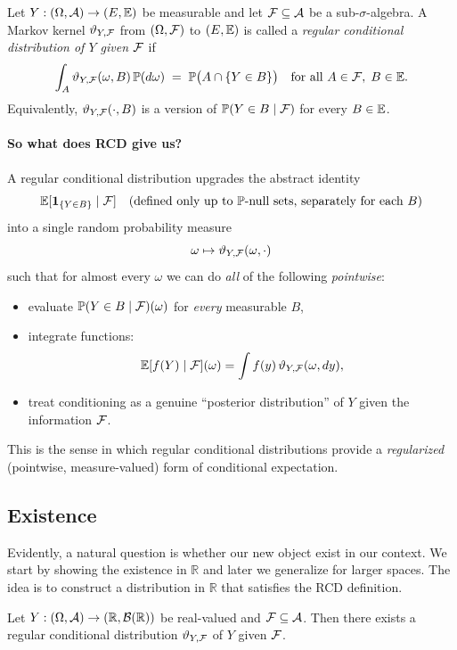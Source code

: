 \begin{definition}
\label{def:rcd}
Let $Y:(\Omega,\mathcal{A})\to(E,\mathbb{E})$ be measurable and let $\mathcal{F}\subseteq \mathcal{A}$ be a sub-$\sigma$-algebra.
A Markov kernel $\vartheta_{Y,\mathcal{F}}$ from $(\Omega,\mathcal{F})$ to $(E,\mathbb{E})$ is called a \emph{regular conditional distribution of $Y$ given $\mathcal{F}$} if
\begin{equation}
\label{eq:rcd-def}
\int_A \vartheta_{Y,\mathcal{F}}(\omega,B)\,\mathbb{P}(d\omega) \;=\; \mathbb{P}\big(A\cap \{Y\in B\}\big)
\quad\text{for all }A\in\mathcal{F},\; B\in\mathbb{E}.
\end{equation}
Equivalently, $\vartheta_{Y,\mathcal{F}}(\cdot,B)$ is a version of $\mathbb{P}(Y\in B\mid \mathcal{F})$ for every $B\in\mathbb{E}$.
\end{definition}



\paragraph{So what does RCD give us?}
A regular conditional distribution upgrades the abstract identity
\[
\mathbb{E}[\mathbf{1}_{\{Y\in B\}}\mid \mathcal{F}]
\quad\text{(defined only up to $\mathbb{P}$-null sets, separately for each $B$)}
\]
into a single random probability measure
\[
\omega \mapsto \vartheta_{Y,\mathcal{F}}(\omega,\cdot)
\]
such that for almost every $\omega$ we can do \emph{all} of the following \emph{pointwise}:
\begin{itemize}
\item evaluate $\mathbb{P}(Y\in B\mid \mathcal{F})(\omega)$ for \emph{every} measurable $B$,
\item integrate functions:
\[
\mathbb{E}[f(Y)\mid \mathcal{F}](\omega)=\int f(y)\,\vartheta_{Y,\mathcal{F}}(\omega,dy),
\]
\item treat conditioning as a genuine ``posterior distribution'' of $Y$ given the information $\mathcal{F}$.
\end{itemize}
This is the sense in which regular conditional distributions provide a \emph{regularized} (pointwise, measure-valued) form of conditional expectation.

\subsection*{Existence}
Evidently, a natural question is whether our new object exist in our context. We start by showing the existence in $\mathbb{R}$ and later we generalize for larger spaces. The idea is to construct a distribution in $\mathbb{R}$ that satisfies the RCD definition.
\begin{theorem}
\label{thm:rcd-R}
Let $Y:(\Omega,\mathcal{A})\to(\mathbb{R},\mathcal{B}(\mathbb{R}))$ be real-valued and $\mathcal{F}\subseteq \mathcal{A}$.
Then there exists a regular conditional distribution $\vartheta_{Y,\mathcal{F}}$ of $Y$ given $\mathcal{F}$.
\end{theorem}

